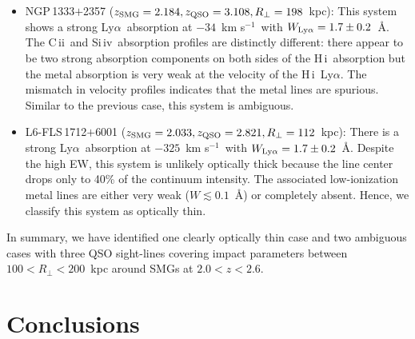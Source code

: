 \documentclass[iop,revtex4,twocolumn,apj,numberedappendix,appendixfloats]{emulateapj}
\newcommand{\kms}{{km s$^{-1}$}}
\newcommand{\lya}{Ly$\alpha$}
\newcommand{\HI}{H\,{\sc i}}
\newcommand{\CII}{C\,{\sc ii}}
\newcommand{\SiIV}{Si\,{\sc iv}}
\begin{document}
\begin{itemize}
\item NGP\,1333$+$2357 ($z_{\rm SMG} = 2.184, z_{\rm QSO} = 3.108, R_\bot = 198$~kpc): This system shows a strong \lya\ absorption at $-34$~\kms\ with $W_{\rm Ly\alpha} = 1.7\pm0.2$~\AA. The \CII\ and \SiIV\ absorption profiles are distinctly different: there appear to be two strong absorption components on both sides of the \HI\ absorption but the metal absorption is very weak at the velocity of the \HI\ \lya. The mismatch in velocity profiles indicates that the metal lines are spurious. Similar to the previous case, this system is ambiguous. 

\item L6-FLS\,1712$+$6001 ($z_{\rm SMG} = 2.033, z_{\rm QSO} = 2.821, R_\bot = 112$~kpc): There is a strong \lya\ absorption at $-325$~\kms\ with $W_{\rm Ly\alpha} = 1.7\pm0.2$~\AA. Despite the high EW, this system is unlikely optically thick because the line center drops only to 40\% of the continuum intensity. The associated low-ionization metal lines are either very weak ($W \lesssim 0.1$~\AA) or completely absent. Hence, we classify this system as optically thin.

\end{itemize}

In summary, we have identified one clearly optically thin case and two ambiguous cases with three QSO sight-lines covering impact parameters between $100 < R_\bot < 200$~kpc around SMGs at $2.0 < z < 2.6$. 

\section{Conclusions} \label{sec:discuss}

\end{document}
